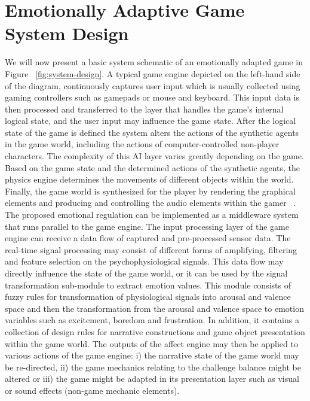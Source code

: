 \section{Emotionally Adaptive Game System Design}

We will now present a basic system schematic of an emotionally adapted game in Figure ~\ref{fig:system-design}. A typical game engine depicted on the left-hand side of the diagram, continuously captures user input which is usually collected using gaming controllers such as gamepads or mouse and keyboard. %
This input data is then processed and transferred to the layer that handles the game's internal logical state, and the user input may influence the game state. After the logical state of the game is defined the system alters the actions of the synthetic agents in the game world, including the actions of computer-controlled non-player characters. The complexity of this AI layer varies greatly depending on the game. Based on the game state and the determined actions of the synthetic agents, the physics engine determines the movements of different objects within the world. Finally, the game world is synthesized for the player by rendering the graphical elements and producing and controlling the audio elements within the gamer ~\cite{saari2005emotional}. The proposed emotional regulation can be implemented as a middleware system that runs parallel to the game engine. The input processing layer of the game engine can receive a data flow of captured and pre-processed sensor data. The real-time signal processing may consist of different forms of amplifying, filtering and feature selection on the psychophysiological signals. This data flow may directly influence the state of the game world, or it can be used by the signal transformation sub-module to extract emotion values. This module consists of fuzzy rules for transformation of physiological signals into arousal and valence space and then the transformation from the arousal and valence space to emotion variables such as excitement, boredom and frustration. In addition, it contains a collection of design rules for narrative constructions and game object presentation within the game world. The outputs of the affect engine may then be applied to various actions of the game engine: i) the narrative state of the game world may be re-directed, ii) the game mechanics relating to the challenge balance might be altered or iii) the game might be adapted in its presentation layer such as visual or sound effects (non-game mechanic elements).

